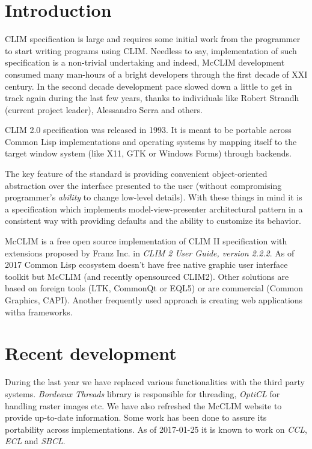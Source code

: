 \documentclass{sig-alternate-05-2015}
\begin{document}

\section{Introduction}

CLIM specification is large and requires some initial work from the
programmer to start writing programs using CLIM. Needless to say,
implementation of such specification is a non-trivial undertaking and
indeed, McCLIM development consumed many man-hours of a bright
developers through the first decade of XXI century. In the second
decade development pace slowed down a little to get in track again
during the last few years, thanks to individuals like Robert Strandh
(current project leader), Alessandro Serra and others.

CLIM 2.0 specification was released in 1993. It is meant to be
portable across Common Lisp\cite{ansi:common:lisp} implementations and
operating systems by mapping itself to the target window system (like
X11\cite{X11}, GTK\cite{GTK} or Windows Forms\cite{WindowsForms})
through backends.

The key feature of the standard is providing convenient
object-oriented abstraction over the interface presented to the user
(without compromising programmer's \emph{ability} to change low-level
details). With these things in mind it is a specification which
implements model-view-presenter architectural pattern in a consistent
way with providing defaults and the ability to customize its behavior.

McCLIM is a free open source implementation of CLIM II specification
with extensions proposed by Franz Inc. in \emph{CLIM 2 User Guide,
  version 2.2.2}. As of 2017 Common Lisp ecosystem doesn't have free
native graphic user interface toolkit but McCLIM (and recently
opensourced CLIM2). Other solutions are based on foreign tools
(LTK\cite{LTK}, CommonQt\cite{CommonQt} or EQL5\cite{EQL5}) or are
commercial (Common Graphics\cite{CG}, CAPI\cite{CAPI}). Another
frequently used approach is creating web applications witha
frameworks.

\section{Recent development}

During the last year we have replaced various functionalities with the
third party systems. \emph{Bordeaux Threads}\cite{BT} library is
responsible for threading, \emph{OptiCL}\cite{OptiCL} for handling
raster images etc. We have also refreshed the McCLIM website to
provide up-to-date information. Some work has been done to assure its
portability across implementations. As of 2017-01-25 it is known to
work on \emph{CCL}\cite{CCL}, \emph{ECL}\cite{ECL} and
\emph{SBCL}\cite{SBCL}.
\end{document}
